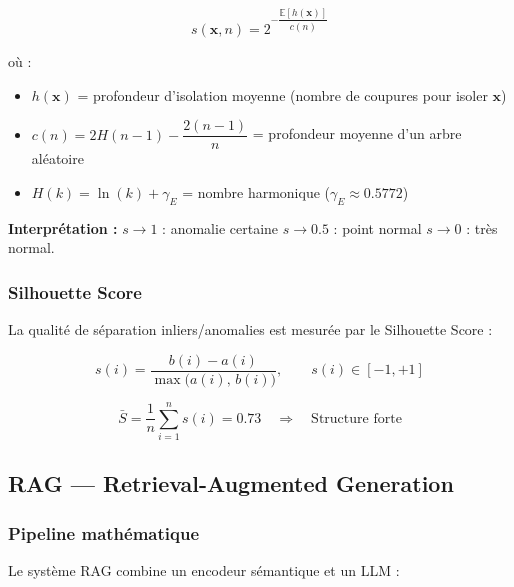\begin{equation}
\boxed{
s(\mathbf{x}, n) = 2^{-\dfrac{\mathbb{E}[h(\mathbf{x})]}{c(n)}}
}
\label{eq:isof_score}
\end{equation}

où :
\begin{itemize}
  \item $h(\mathbf{x})$ = profondeur d'isolation moyenne (nombre de coupures pour isoler $\mathbf{x}$)
  \item $c(n) = 2H(n-1) - \dfrac{2(n-1)}{n}$ = profondeur moyenne d'un arbre aléatoire
  \item $H(k) = \ln(k) + \gamma_E$ = nombre harmonique ($\gamma_E \approx 0.5772$)
\end{itemize}

\noindent\textbf{Interprétation :}
$s \to 1$ : anomalie certaine \quad $s \to 0.5$ : point normal \quad $s \to 0$ : très normal.

\subsubsection{Silhouette Score}

La qualité de séparation inliers/anomalies est mesurée par le Silhouette Score :

\begin{equation}
s(i) = \frac{b(i) - a(i)}{\max\bigl(a(i),\, b(i)\bigr)}, \qquad s(i) \in [-1, +1]
\label{eq:silhouette}
\end{equation}

\begin{equation}
\boxed{
\bar{S} = \frac{1}{n} \sum_{i=1}^n s(i) = 0.73 \quad \Rightarrow \quad \text{Structure forte}
}
\label{eq:sil_result}
\end{equation}

\subsection{RAG — Retrieval-Augmented Generation}

\subsubsection{Pipeline mathématique}

Le système RAG \cite{lewis2020rag} combine un encodeur sémantique et un LLM :

